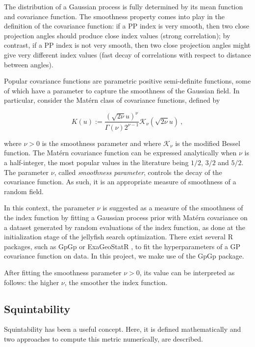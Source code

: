 \documentclass[
  number,
  preprint,
  3p]{elsarticle}
\begin{document}
The distribution of a Gaussian process is fully determined by its mean
function and covariance function. The smoothness property comes into
play in the definition of the covariance function: if a PP index is very
smooth, then two close projection angles should produce close index
values (strong correlation); by contrast, if a PP index is not very
smooth, then two close projection angles might give very different index
values (fast decay of correlations with respect to distance between
angles).

Popular covariance functions are parametric positive semi-definite
functions, some of which have a parameter to capture the smoothness of
the Gaussian field. In particular, consider the Matérn class of
covariance functions, defined by

\[
K(u):=\frac{(\sqrt{2\nu}u)^{\nu}}{\Gamma(\nu)2^{\nu-1}}\mathcal{K}_{\nu}(\sqrt{2\nu}u)\ ,
\]

where \(\nu>0\) is the smoothness parameter and where
\(\mathcal{K}_\nu\) is the modified Bessel function. The Matérn
covariance function can be expressed analytically when \(\nu\) is a
half-integer, the most popular values in the literature being \(1/2\),
\(3/2\) and \(5/2\). The parameter \(\nu\), called \emph{smoothness
parameter}, controls the decay of the covariance function. As such, it
is an appropriate measure of smoothness of a random field.

In this context, the parameter \(\nu\) is suggested as a measure of the
smoothness of the index function by fitting a Gaussian process prior
with Matérn covariance on a dataset generated by random evaluations of
the index function, as done at the initialization stage of the jellyfish
search optimization. There exist several R packages, such as GpGp
\citep{guinness2021gpgp} or ExaGeoStatR \citep{abdulah2023large}, to fit
the hyperparameters of a GP covariance function on data. In this
project, we make use of the GpGp package.

After fitting the smoothness parameter \(\nu>0\), its value can be
interpreted as follows: the higher \(\nu\), the smoother the index
function.

\subsection{Squintability}\label{sec-squintability}

Squintability has been a useful concept. Here, it is defined
mathematically and two approaches to compute this metric numerically,
are described.
\end{document}

